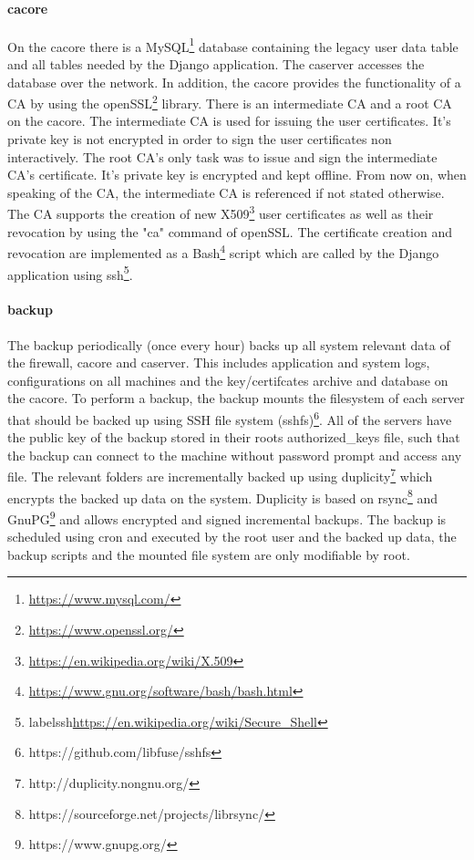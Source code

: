 \documentclass[english]{article}
\begin{document}
\paragraph{cacore}
On the cacore there is a MySQL\footnote{\url{https://www.mysql.com/}} database containing the legacy user data table and all tables needed by the Django application. The caserver accesses the database over the network. In addition, the cacore provides the functionality of a CA by using the openSSL\footnote{\label{openssl}\url{https://www.openssl.org/}} library.
There is an intermediate CA and a root CA on the cacore. The intermediate CA is used for issuing the user certificates. It's private key is not encrypted in order to sign the user certificates non interactively. The root CA's only task was to issue and sign the intermediate CA's certificate. It's private key is encrypted and kept offline. From now on, when speaking of the CA, the intermediate CA is referenced if not stated otherwise.
The CA supports the creation of new X509\footnote{\url{https://en.wikipedia.org/wiki/X.509}} user certificates as well as their revocation by using the "ca" command of openSSL. The certificate creation and revocation are implemented as a Bash\footnote{\url{https://www.gnu.org/software/bash/bash.html}} script which are called by the Django application using ssh\footnote{label{ssh}\url{https://en.wikipedia.org/wiki/Secure_Shell}}.

\paragraph{backup} 

The backup periodically (once every hour) backs up all system relevant data of the firewall, cacore and caserver. This includes application and system logs, configurations on all machines and the key/certifcates archive and database on the cacore. To perform a backup, the backup mounts the filesystem of each server that should be backed up using SSH file system (sshfs)\footnote{https://github.com/libfuse/sshfs}. All of the servers have the public key of the backup stored in their roots authorized\_keys file, such that the backup can connect to the machine without password prompt and access any file. The relevant folders are incrementally backed up using duplicity\footnote{http://duplicity.nongnu.org/} which encrypts the backed up data on the system. Duplicity is based on rsync\footnote{https://sourceforge.net/projects/librsync/} and GnuPG\footnote{https://www.gnupg.org/} and allows encrypted and signed incremental backups. The backup is scheduled using cron and executed by the root user and the backed up data, the backup scripts and the mounted file system are only modifiable by root.
 
\end{document}
